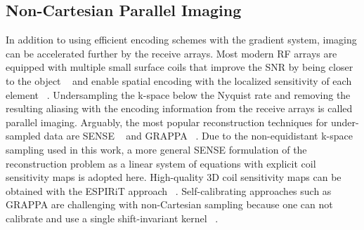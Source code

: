 \subsection{Non-Cartesian Parallel Imaging}\label{sec:PI}
In addition to using efficient encoding schemes with the gradient system, imaging can be accelerated further by the receive arrays. Most modern \gls{RF} arrays are equipped with multiple small surface coils that improve the \gls{SNR} by being closer to the object ~\cite{roemerNMRPhasedArray1990} and enable spatial encoding with the localized sensitivity of each element ~\cite{sodicksonSpatialEncodingUsing2007}. Undersampling the k-space below the Nyquist rate and removing the resulting aliasing with the encoding information from the receive arrays is called parallel imaging. Arguably, the most popular reconstruction techniques for under-sampled data are \gls{SENSE} ~\cite{pruessmannSENSESensitivityEncoding1999} and \gls{GRAPPA} ~\cite{griswoldGeneralizedAutocalibratingPartially2002}. Due to the non-equidistant k-space sampling used in this work, a more general \gls{SENSE} formulation of the reconstruction problem as a linear system of equations with explicit coil sensitivity maps is adopted here. High-quality 3D coil sensitivity maps can be obtained with the ESPIRiT approach ~\cite{ueckerESPIRiTanEigenvalueApproach2014}. Self-calibrating approaches such as \gls{GRAPPA} are challenging with non-Cartesian sampling because one can not calibrate and use a single shift-invariant kernel  ~\cite{heidemannDirectParallelImage2006,huangSelfcalibrationMethodRadial2007}. 
\\
